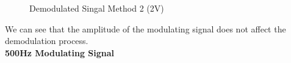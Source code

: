 \documentclass[12pt]{article}
\begin{document}
\begin{figure}[H]
    \centering
    \caption{Demodulated Singal Method 2 (2V)}
\end{figure}
We can see that the amplitude of the modulating signal does not affect the demodulation process. \\
\textbf{500Hz Modulating Signal}
\end{document}
